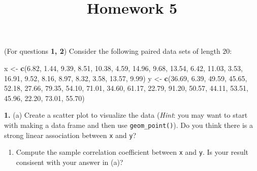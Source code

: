 \documentclass[]{article}
\title{Homework 5}
\author{}
\date{}
\newenvironment{Shaded}{\begin{snugshade}}{\end{snugshade}}
\newcommand{\KeywordTok}[1]{\textcolor[rgb]{0.13,0.29,0.53}{\textbf{#1}}}
\newcommand{\FloatTok}[1]{\textcolor[rgb]{0.00,0.00,0.81}{#1}}
\newcommand{\StringTok}[1]{\textcolor[rgb]{0.31,0.60,0.02}{#1}}
\newcommand{\NormalTok}[1]{#1}
\providecommand{\tightlist}{%
  \setlength{\itemsep}{0pt}\setlength{\parskip}{0pt}}
\begin{document}
\maketitle

\bigskip

(For questions \textbf{1, 2}) Consider the following paired data sets of
length \(20\):

\begin{Shaded}
\begin{Highlighting}[]
\NormalTok{x <-}\StringTok{ }\KeywordTok{c}\NormalTok{(}\FloatTok{6.82}\NormalTok{, }\FloatTok{1.44}\NormalTok{, }\FloatTok{9.39}\NormalTok{,  }\FloatTok{8.51}\NormalTok{, }\FloatTok{10.38}\NormalTok{,  }\FloatTok{4.59}\NormalTok{, }\FloatTok{14.96}\NormalTok{,  }\FloatTok{9.68}\NormalTok{, }\FloatTok{13.54}\NormalTok{,  }\FloatTok{6.42}\NormalTok{, }\FloatTok{11.03}\NormalTok{,  }
       \FloatTok{3.53}\NormalTok{, }\FloatTok{16.91}\NormalTok{,  }\FloatTok{9.52}\NormalTok{,  }\FloatTok{8.16}\NormalTok{,  }\FloatTok{8.97}\NormalTok{,  }\FloatTok{8.32}\NormalTok{,  }\FloatTok{3.58}\NormalTok{, }\FloatTok{13.57}\NormalTok{,  }\FloatTok{9.99}\NormalTok{)}
\NormalTok{y <-}\StringTok{ }\KeywordTok{c}\NormalTok{(}\FloatTok{36.69}\NormalTok{, }\FloatTok{6.39}\NormalTok{, }\FloatTok{49.59}\NormalTok{, }\FloatTok{45.65}\NormalTok{, }\FloatTok{52.18}\NormalTok{, }\FloatTok{27.66}\NormalTok{, }\FloatTok{79.35}\NormalTok{, }\FloatTok{54.10}\NormalTok{, }\FloatTok{71.01}\NormalTok{, }\FloatTok{34.60}\NormalTok{, }\FloatTok{61.17}\NormalTok{, }
       \FloatTok{22.79}\NormalTok{, }\FloatTok{91.20}\NormalTok{, }\FloatTok{50.57}\NormalTok{, }\FloatTok{44.11}\NormalTok{, }\FloatTok{53.51}\NormalTok{, }\FloatTok{45.96}\NormalTok{, }\FloatTok{22.20}\NormalTok{, }\FloatTok{73.01}\NormalTok{, }\FloatTok{55.70}\NormalTok{)}
\end{Highlighting}
\end{Shaded}

\textbf{1.} (a) Create a scatter plot to visualize the data
(\emph{Hint}: you may want to start with making a data frame and then
use \texttt{geom\_point()}). Do you think there is a strong linear
association between \texttt{x} and \texttt{y}?

\begin{enumerate}
\def\labelenumi{(\alph{enumi})}
\setcounter{enumi}{1}
\tightlist
\item
  Compute the sample correlation coefficient between \texttt{x} and
  \texttt{y}. Is your result consisent with your answer in (a)?
\end{enumerate}
\end{document}
